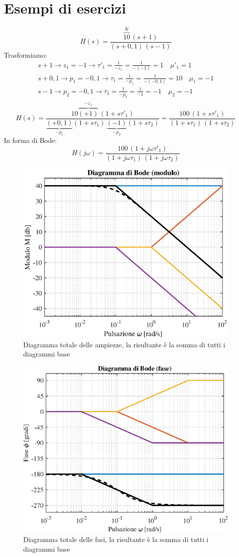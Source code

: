 \section{Esempi di esercizi}
\begin{nexample}
	\[ H(s) = \frac{\overbrace{10}^{K} \, (s+1)}{(s+0,1)\,(s-1)} \]
	Trasformiamo:
	\begin{gather*}
		s+1\rightarrow z_1 =-1\rightarrow\tau'_1 = \frac{1}{-z_1}= \frac{1}{-(-1)}=1 \quad \mu'_1 = 1 \\
		s+0,1\rightarrow p_1 =-0,1\rightarrow\tau_1 = \frac{1}{-p_1} = \frac{1}{-(-0,1)}=10 \quad \mu_1 = -1 \\
		s-1\rightarrow p_2 =-0,1\rightarrow\tau_1 = \frac{1}{-p_2}= \frac{1}{-1}=-1 \quad \mu_2 = -1 \\
	\end{gather*}
	\[
		H(s) = \frac{10\overbrace{(+1)}^{-z_1} \, (1+s\tau'_1)}{\underbrace{(+0,1)}_{-p_1}(1+s\tau_1)\,\underbrace{(-1)}_{-p_2}(1+s\tau_2)} =
		\frac{100 \, (1+s\tau'_1)}{(1+s\tau_1)\,(1+s\tau_2)}
	\]
	In forma di Bode:
	\[  H(j\omega) = \frac{100 \, (1+j\omega\tau'_1)}{(1+j\omega\tau_1)\,(1+j\omega\tau_2)}\]
	
\begin{figure}[H]
	\centering
	\includegraphics[width=0.7\linewidth]{immagini/cap6_Bode/es5-amp}
	\caption{Diagramma totale delle ampiezze, la risultante è la somma di tutti i diagrammi base}
	\label{fig:es5-amp}
\end{figure}
\begin{figure}[H]
	\centering
	\includegraphics[width=0.7\linewidth]{immagini/cap6_Bode/es5-fas}
	\caption{Diagramma totale delle fasi, la risultante è la somma di tutti i diagrammi base}
	\label{fig:es5-fas}
\end{figure}
\end{nexample}